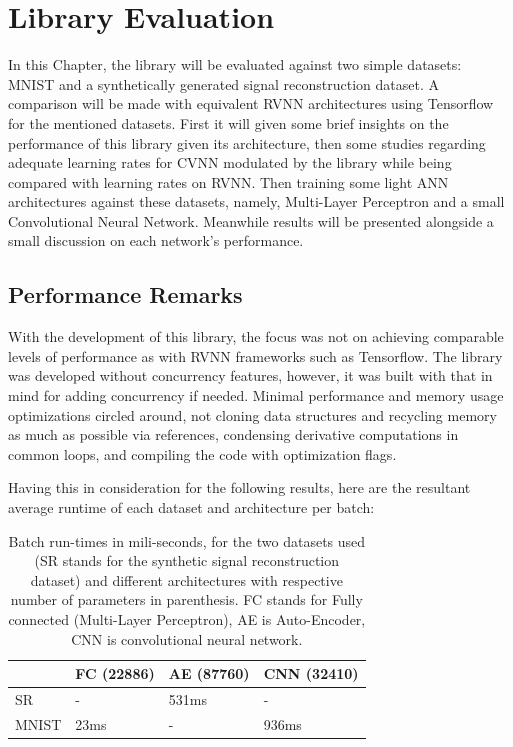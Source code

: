 \chapter{Library Evaluation}
\label{cp:eval}

In this Chapter, the library will be evaluated against two simple datasets: MNIST \parencite{lecun1998mnist} and a synthetically generated signal reconstruction dataset. A comparison will be made with equivalent \gls{RVNN} architectures using Tensorflow for the mentioned datasets.  First it will given some brief insights on the performance of this library given its architecture, then some studies regarding adequate learning rates for \gls{CVNN} modulated by the library while being compared with learning rates on \gls{RVNN}. Then training some light \gls{ANN} architectures against these datasets, namely, Multi-Layer Perceptron and a small Convolutional Neural Network. Meanwhile results will be presented alongside a small discussion on each network's performance.

\section{Performance Remarks}
With the development of this library, the focus was not on achieving comparable levels of performance as with \gls{RVNN} frameworks such as Tensorflow. The library was developed without concurrency features, however, it was built with that in mind for adding concurrency if needed. Minimal performance and memory usage optimizations circled around, not cloning data structures and recycling memory as much as possible via references, condensing derivative computations in common loops, and compiling the code with optimization flags.

Having this in consideration for the following results, here are the resultant average runtime of each dataset and architecture per batch:

\begin{table}[h]
	\centering
	\begin{tabular}{llll}
		& FC (22886) & AE (87760) & CNN (32410) \\ \hline
	SR	& - & 531ms & - \\
	MNIST	& 23ms & - & 936ms
	\end{tabular}
	\label{tab:times}
	\caption{Batch run-times in mili-seconds, for the two datasets used (SR stands for the synthetic signal reconstruction dataset) and different architectures with respective number of parameters in parenthesis. FC stands for Fully connected (Multi-Layer Perceptron),  AE is Auto-Encoder, CNN is convolutional neural network.}
\end{table}

